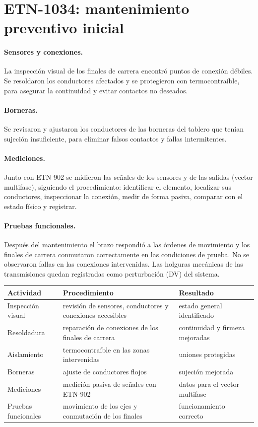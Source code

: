 \documentclass[a4paper,11pt]{article}
\begin{document}
\section{ETN-1034: mantenimiento preventivo inicial}\label{sec:mantenimiento}
\paragraph{Sensores y conexiones.} La inspección visual de los finales de carrera encontró puntos de conexión débiles. Se resoldaron los conductores afectados y se protegieron con termocontraíble, para asegurar la continuidad y evitar contactos no deseados.
\paragraph{Borneras.} Se revisaron y ajustaron los conductores de las borneras del tablero que tenían sujeción insuficiente, para eliminar falsos contactos y fallas intermitentes.
\paragraph{Mediciones.} Junto con ETN-902 se midieron las señales de los sensores y de las salidas (vector multifase), siguiendo el procedimiento: identificar el elemento, localizar sus conductores, inspeccionar la conexión, medir de forma pasiva, comparar con el estado físico y registrar.
\paragraph{Pruebas funcionales.} Después del mantenimiento el brazo respondió a las órdenes de movimiento y los finales de carrera conmutaron correctamente en las condiciones de prueba. No se observaron fallas en las conexiones intervenidas. Las holguras mecánicas de las transmisiones quedan registradas como perturbación (DV) del sistema.

\begin{center}\small
\begin{tabularx}{\linewidth}{>{\raggedright}p{3cm} >{\raggedright}X >{\raggedright\arraybackslash}p{4.4cm}}
\toprule
\textbf{Actividad} & \textbf{Procedimiento} & \textbf{Resultado}\\
\midrule
Inspección visual & revisión de sensores, conductores y conexiones accesibles & estado general identificado\\
Resoldadura & reparación de conexiones de los finales de carrera & continuidad y firmeza mejoradas\\
Aislamiento & termocontraíble en las zonas intervenidas & uniones protegidas\\
Borneras & ajuste de conductores flojos & sujeción mejorada\\
Mediciones & medición pasiva de señales con ETN-902 & datos para el vector multifase\\
Pruebas funcionales & movimiento de los ejes y conmutación de los finales & funcionamiento correcto\\
\bottomrule
\end{tabularx}\end{center}
\end{document}
